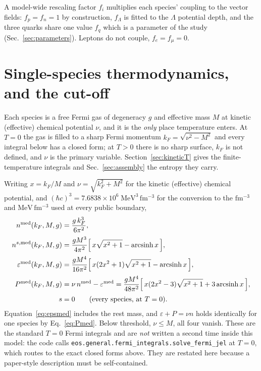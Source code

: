 \documentclass[aps,prc,onecolumn,superscriptaddress,nofootinbib,10pt]{revtex4-2}
\newcommand{\hc}{(\hbar c)^3}
\newcommand{\kF}{k_F}
\begin{document}
A model-wide rescaling factor $f_i$ multiplies each species' coupling to the
vector fields: $f_p = f_n = 1$ by construction, $f_\Lambda$ is fitted to the
$\Lambda$ potential depth, and the three quarks share one value $f_q$ which is
a parameter of the study (Sec.~\ref{sec:parameters}). Leptons do not couple,
$f_e = f_\mu = 0$.

\section{Single-species thermodynamics, and the cut-off}
\label{sec:kinetic}

Each species is a free Fermi gas of degeneracy $g$ and effective mass $M$ at
kinetic (effective) chemical potential $\nu$, and it is the \emph{only} place
temperature enters. At $T = 0$ the gas is filled to a sharp Fermi momentum
$\kF = \sqrt{\nu^2 - M^2}$ and every integral below has a closed form; at
$T > 0$ there is no sharp surface, $\kF$ is not defined, and $\nu$ is the
primary variable. Section~\ref{sec:kineticT} gives the finite-temperature
integrals and Sec.~\ref{sec:assembly} the entropy they carry.

Writing $x = \kF/M$ and $\nu = \sqrt{\kF^2 + M^2}$ for the
kinetic (effective) chemical potential, and $\hc = 7.6838\times10^{6}\;
\mathrm{MeV^3\,fm^{-3}}$ for the conversion to the $\mathrm{fm^{-3}}$ and
$\mathrm{MeV\,fm^{-3}}$ used at every public boundary,
%
\begin{align}
n^{\rm med}(\kF, M, g) &= \frac{g\,\kF^3}{6\pi^2} ,
\label{eq:nmed}\\[2pt]
n^{s,{\rm med}}(\kF, M, g) &= \frac{g M^3}{4\pi^2}
   \Big[\, x\sqrt{x^2+1} - \operatorname{arcsinh} x \,\Big] ,
\label{eq:nsmed}\\[2pt]
\varepsilon^{\rm med}(\kF, M, g) &= \frac{g M^4}{16\pi^2}
   \Big[\, x(2x^2+1)\sqrt{x^2+1} - \operatorname{arcsinh} x \,\Big] ,
\label{eq:epsmed}\\[2pt]
P^{\rm med}(\kF, M, g) &= \nu\, n^{\rm med} - \varepsilon^{\rm med}
 = \frac{g M^4}{48\pi^2}
   \Big[\, x(2x^2-3)\sqrt{x^2+1} + 3\operatorname{arcsinh} x \,\Big] ,
\label{eq:Pmed}\\[2pt]
s &= 0 \qquad\text{(every species, at $T = 0$)} .
\label{eq:s}
\end{align}
%
Equation~\eqref{eq:epsmed} includes the rest mass, and $\varepsilon + P =
\nu n$ holds identically for one species by Eq.~\eqref{eq:Pmed}. Below
threshold, $\nu \le M$, all four vanish. These are the standard
$T = 0$ Fermi integrals and are \emph{not} written a second time inside this
model: the code calls
\texttt{eos.general.fermi\_integrals.solve\_fermi\_jel} at $T = 0$, which
routes to the exact closed forms above. They are restated here because a
paper-style description must be self-contained.
\end{document}
